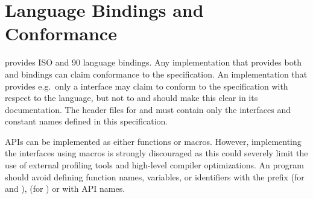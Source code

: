 \section{Language Bindings and Conformance}


\openshmem provides ISO \Clang{} and \Fortran{} 90 language
bindings. Any implementation that provides both \Clang{} and \Fortran{} bindings 
can claim conformance to the specification. An implementation that provides e.g.\ only a \Clang{} interface may claim to conform to the \openshmem specification with respect to
the \Clang{} language, but not to \Fortran{} and should make this clear in its documentation. The \openshmem header files for \Clang{} and \Fortran{} must contain only the interfaces 
and constant names defined in this specification.

\openshmem{} \ac{API}s can be implemented as either 
functions or macros. However, implementing the interfaces using macros is
strongly discouraged as this could severely limit the use of external profiling tools 
and high-level compiler optimizations. An \openshmem{} program should avoid defining function names, variables, or
identifiers with the prefix \shmemprefix{} (for \Clang{} and \Fortran{}), \shmemprefixC{} (for \Clang{}) or with \openshmem \ac{API} names.


 
%

